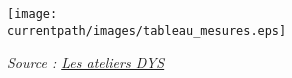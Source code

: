 \begin{enigme}
    \texttt{[image: \\currentpath/images/tableau\_mesures.eps]}
    \begin{flushright}
       {\it\footnotesize Source : \href{https://ateliersdys.ch/les-unites-de-mesure}{Les ateliers DYS}}
    \end{flushright}
\end{enigme}
  
%     
